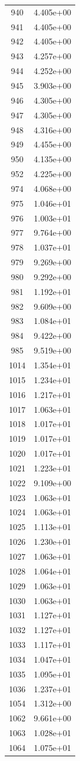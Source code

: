 \documentclass[12pt]{article}
\begin{document}
\begin{longtable}{@{}cc@{}}
940 & 4.405e+00 \\
941 & 4.405e+00 \\
942 & 4.405e+00 \\
943 & 4.257e+00 \\
944 & 4.252e+00 \\
945 & 3.903e+00 \\
946 & 4.305e+00 \\
947 & 4.305e+00 \\
948 & 4.316e+00 \\
949 & 4.455e+00 \\
950 & 4.135e+00 \\
952 & 4.225e+00 \\
974 & 4.068e+00 \\
975 & 1.046e+01 \\
976 & 1.003e+01 \\
977 & 9.764e+00 \\
978 & 1.037e+01 \\
979 & 9.269e+00 \\
980 & 9.292e+00 \\
981 & 1.192e+01 \\
982 & 9.609e+00 \\
983 & 1.084e+01 \\
984 & 9.422e+00 \\
985 & 9.519e+00 \\
1014 & 1.354e+01 \\
1015 & 1.234e+01 \\
1016 & 1.217e+01 \\
1017 & 1.063e+01 \\
1018 & 1.017e+01 \\
1019 & 1.017e+01 \\
1020 & 1.017e+01 \\
1021 & 1.223e+01 \\
1022 & 9.109e+00 \\
1023 & 1.063e+01 \\
1024 & 1.063e+01 \\
1025 & 1.113e+01 \\
1026 & 1.230e+01 \\
1027 & 1.063e+01 \\
1028 & 1.064e+01 \\
1029 & 1.063e+01 \\
1030 & 1.063e+01 \\
1031 & 1.127e+01 \\
1032 & 1.127e+01 \\
1033 & 1.117e+01 \\
1034 & 1.047e+01 \\
1035 & 1.095e+01 \\
1036 & 1.237e+01 \\
1054 & 1.312e+00 \\
1062 & 9.661e+00 \\
1063 & 1.028e+01 \\
1064 & 1.075e+01 \\

\bottomrule
\end{longtable}
\end{document}
